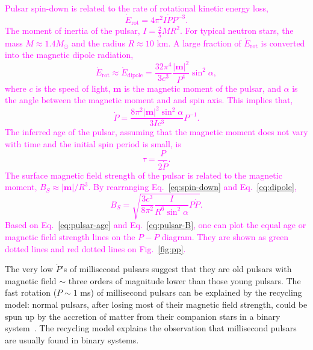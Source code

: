 \documentclass[doublespace,nopageskip]{VTthesis} %
\newcommand{\DS}[1]{\textcolor{magenta}{#1}}
\begin{document}
\DS{
Pulsar spin-down is related to the rate of rotational kinetic energy loss,
\begin{equation}\label{eq:spin-down}
    \dot{E}_\mathrm{rot} = 4\pi^2 I \dot{P}P^{-3}.
\end{equation}
The moment of inertia of the pulsar, $I = \frac{2}{5}MR^2$. For typical neutron stars, the mass $M \approx 1.4 M_\odot$ and the radius $R \approx 10$ km. 
A large fraction of $\dot{E}_\mathrm{rot}$ is converted into the magnetic dipole radiation,
\begin{equation}\label{eq:dipole}
\dot{E}_\mathrm{rot} \approx \dot{E}_\mathrm{dipole} = \frac{32\pi^4}{3c^3}\frac{|\bm{m}|^2}{P^4}\sin^2\alpha,
\end{equation}
where $c$ is the speed of light, $\bm{m}$ is the magnetic moment of the pulsar, and $\alpha$ is the angle between the magnetic moment and and spin axis. This implies that,
\begin{equation}
    \dot{P} = \frac{8\pi^2|\bm{m}|^2\sin^2\alpha}{3Ic^3}P^{-1}.
\end{equation}
The inferred age of the pulsar, assuming that the magnetic moment does not vary with time and the initial spin period is small, is
\begin{equation}\label{eq:pulsar-age}
    \tau = \frac{P}{2\dot{P}}.
\end{equation}
The surface magnetic field strength of the pulsar is related to the magnetic moment, $B_S\approx|\bm{m}|/R^3$. By rearranging Eq.~\ref{eq:spin-down} and Eq.~\ref{eq:dipole},
\begin{equation}\label{eq:pulsar-B}
    B_S = \sqrt{\dfrac{3c^3}{8\pi^2}\dfrac{I}{R^6\sin^2\alpha}P\dot{P}}.
\end{equation}
Based on Eq.~\ref{eq:pulsar-age} and Eq.~\ref{eq:pulsar-B}, one can plot the equal age or magnetic field strength lines on the $P-\dot{P}$ diagram. They are shown as green dotted lines and red dotted lines on Fig.~\ref{fig:pp}.
}

The very low $\dot{P}$'s of millisecond pulsars suggest that they are old pulsars with magnetic field $\sim$ three orders of magnitude lower than those young pulsars. The fast rotation ($P \sim 1$ ms) of millisecond pulsars can be explained by the recycling model: normal pulsars, after losing most of their magnetic field strength, could be spun up by the accretion of matter from their companion stars in a binary system~\cite{1982Natur.300..728A,1998Natur.394..344W}. The recycling model explains the observation that millisecond pulsars are usually found in binary systems.
\end{document}
